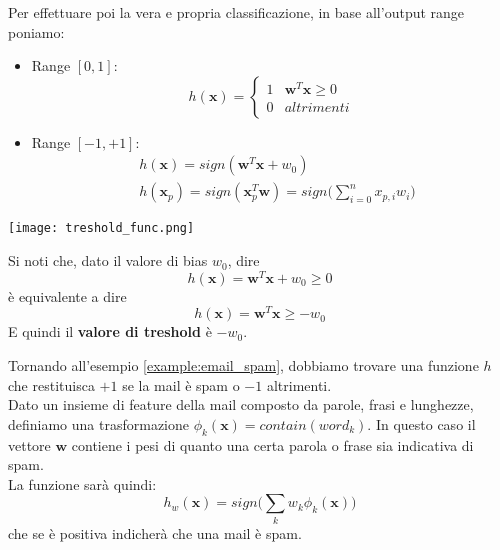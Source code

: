 \noindent Per effettuare poi la vera e propria classificazione, in base all'output range poniamo:
\begin{itemize}
	\item Range $[0,1]$:
	\begin{equation}
		h(\mathbf{x}) = \begin{cases}
			1 & \mathbf{w}^T\mathbf{x} \geq 0 \\
			0 & altrimenti
		\end{cases}
	\end{equation}
	\item Range $[-1,+1]$:
	\begin{align}
		& h(\mathbf{x}) = sign(\mathbf{w}^T\mathbf{x} + w_0) \\
		& h(\mathbf{x}_p) = sign(\mathbf{x}_p^T\mathbf{w}) = sign\bigg(\sum_{i=0}^{n} x_{p,i}w_i\bigg)
	\end{align}
\end{itemize}
\begin{center}
	\texttt{[image: treshold\_func.png]}
\end{center}

\begin{observation}
	Si noti che, dato il valore di bias $w_0$, dire
	\begin{equation*}
		h(\mathbf{x}) = \mathbf{w}^T\mathbf{x} + w_0 \geq 0
	\end{equation*}
	è equivalente a dire
	\begin{equation*}
		h(\mathbf{x}) = \mathbf{w}^T\mathbf{x} \geq - w_0
	\end{equation*}
	E quindi il \textbf{valore di treshold} è $-w_0$.
\end{observation}

\begin{example}[Spam]
	Tornando all'esempio \ref{example:email_spam}, dobbiamo trovare una funzione $h$ che restituisca $+1$ se la mail è spam o $-1$ altrimenti.\\
	Dato un insieme di feature della mail composto da parole, frasi e lunghezze, definiamo una trasformazione $\phi_k (\mathbf{x})=contain(word_k)$. In questo caso il vettore $\mathbf{w}$ contiene i pesi di quanto una certa parola o frase sia indicativa di spam.\\
	La funzione sarà quindi:
	\begin{equation*}
		h_w(\mathbf{x})=sign\bigg(\sum_k w_k\phi_k(\mathbf{x})\bigg)
	\end{equation*}
	che se è positiva indicherà che una mail è spam.
\end{example}
